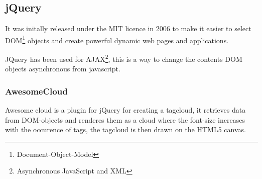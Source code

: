 \subsection{jQuery}
It was initally released under the MIT licence in 2006 to make it easier to select DOM\footnote{Document-Object-Model} objects and create powerful dynamic web pages and applications.

JQuery has been used for AJAX\footnote{Asynchronous JavaScript and XML}, this is a way to change the contents DOM objects asynchronous from javascript.

\subsubsection{AwesomeCloud}
Awesome cloud is a plugin for jQuery for creating a tagcloud, it retrieves data from DOM-objects and renderes them as a cloud where the font-size increases with the occurence of tags, the tagcloud is then drawn on the HTML5 canvas.
